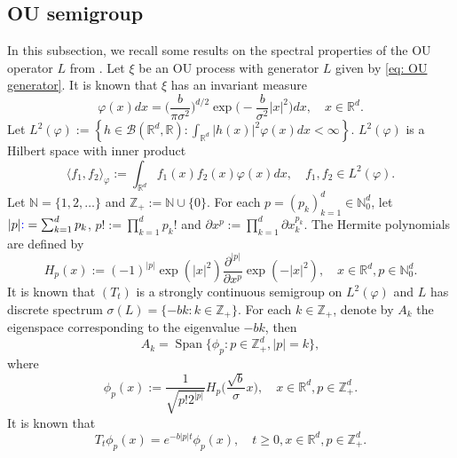 \documentclass[12pt]{amsart}
\theoremstyle{plain}
\theoremstyle{definition}
\numberwithin{equation}{section}
\newcommand{\added}[1]{{\color{blue}#1}}\newcommand{\deleted}[1]{{\color{red}#1}}
\begin{document}
\subsection{OU semigroup}
    In this subsection, we recall some results on the spectral properties of the OU operator $L$ from \cite{GD}.
    Let $\xi$ be an OU process with generator $L$ given by \eqref{eq: OU generator}.
    It is known that $\xi$ has an invariant measure
\begin{equation}
\label{invariantdensity}
    \varphi(x)dx
    =\Big (\frac{b}{\pi \sigma^2}\Big )^{d/2}\exp \Big(-\frac{b}{\sigma^2}|x|^2 \Big)dx,
    \quad x\in \mathbb{R}^d.
\end{equation}
    Let $L^2(\varphi):= \left\{ h  \in \mathcal B(\mathbb R^d, \mathbb R): \int_{\mathbb{R}^d} |h(x)|^2 \varphi(x) dx < \infty \right\}$. $L^2(\varphi)$ is a Hilbert space with inner product
\begin{equation}
    \langle f_1, f_2 \rangle_{\varphi}
    := \int_{\mathbb{R}^d}f_1(x)f_2(x)\varphi(x) dx, \quad f_1,f_2 \in L^2(\varphi).
\end{equation}
     Let $\mathbb N = \{1,2,\dots\}$ and $\mathbb Z_+ := \mathbb N\cup\{0\}$.
    For each $p = (p_k)_{k = 1}^d \in \mathbb{N}_0^{d}$, let $|p| \added{ :}=\sum_{k=1}^d p_k$, $p!:= \prod_{k= 1}^d p_k !$ and $\partial x^p:= \prod_{k = 1}^d\partial x_k^{p_k}$.
    The Hermite polynomials are defined by
\begin{equation}
    H_p(x)
    :=(-1)^{|p|}\exp(|x|^2) \frac{\partial ^{|p|}}{\partial x^p} \exp(-|x|^2) ,
    \quad x\in \mathbb R^d, p \in \mathbb{N}_0^{d}.
\end{equation}
    It is known that $(T_t)$ is a strongly continuous semigroup on $L^2(\varphi)$ and $L$ has
    discrete spectrum $\sigma(L)= \{-bk: k \in \mathbb Z_+\}$.
    For each $k \in \mathbb Z_+$, denote by $A_k$ the eigenspace corresponding to the eigenvalue $-bk$, then
\begin{equation}
    A_k
    = \operatorname{Span} \{\phi_p : p\in \mathbb Z_+^d, |p|=k\},
\end{equation}
where
\begin{equation}\label{eigenfunction}
    \phi_p(x)
    := \frac{1}{\sqrt{ p! 2^{|p|} }} H_p \Big(\frac{ \sqrt{b} }{\sigma}x \Big),
    \quad x\in \mathbb{R}^d, p\in \mathbb Z_+^d.
\end{equation}
    It is known that
\begin{equation}\label{semigroupformula}
    T_t\phi_p(x)
    =e^{-b|p|t}\phi_p(x),
    \quad t\geq 0, x\in \mathbb{R}^d, p\in \mathbb Z_+^d.
\end{equation}
\end{document}
